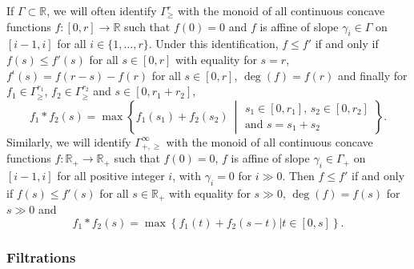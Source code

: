 \documentclass[11pt]{article}
\theoremstyle{definition}
\numberwithin{equation}{section}
\numberwithin{figure}{section}
\numberwithin{table}{section}
\begin{document}
If $\Gamma\subset\mathbb{R}$, we will often identify $\Gamma_{\geq}^{r}$ with the monoid of all continuous concave functions $f:[0,r]\rightarrow\mathbb{R}$ such that $f(0)=0$ and $f$ is affine of slope $\gamma_{i}\in\Gamma$ on $[i-1,i]$ for all $i\in\{1,\dots,r\}$. Under this identification, $f\leq f'$ if and only if $f(s)\leq f'(s)$ for all $s\in[0,r]$ with equality for $s=r$, $f^{\iota}(s)=f(r-s)-f(r)$ for all $s\in[0,r]$, $\deg(f)=f(r)$ and finally for $f_{1}\in\Gamma_{\geq}^{r_{1}}$, $f_{2}\in\Gamma_{\geq}^{r_{2}}$ and $s\in[0,r_{1}+r_{2}]$,
\[
f_{1}\ast f_{2}(s)=\max\left\{ f_{1}(s_{1})+f_{2}(s_{2})\:\middle|
\begin{array}{l}
s_{1}\in[0,r_{1}],\,s_{2}\in[0,r_{2}]\\
\text{and }s=s_{1}+s_{2}
\end{array}\!\right\}.
\]
Similarly, we will identify $\Gamma_{+,\geq}^{\infty}$ with the monoid of all continuous concave functions $f:\mathbb{R}_{+}\rightarrow\mathbb{R}_{+}$ such that $f(0)=0$, $f$ is affine of slope $\gamma_{i}\in\Gamma_{+}$ on $[i-1,i]$ for all positive integer $i$, with $\gamma_{i}=0$ for $i\gg0$. Then $f\leq f'$ if and only if $f(s)\leq f'(s)$ for all $s\in\mathbb{R}_{+}$ with equality for $s\gg0$, $\deg(f)=f(s)$ for $s\gg0$ and
\[
f_{1}\ast f_{2}(s)=\max\left\{ f_{1}(t)+f_{2}(s-t)\vert t\in[0,s]\right\}.
\]


\subsubsection{Filtrations}\label{subsec:Filtrations}
\end{document}

